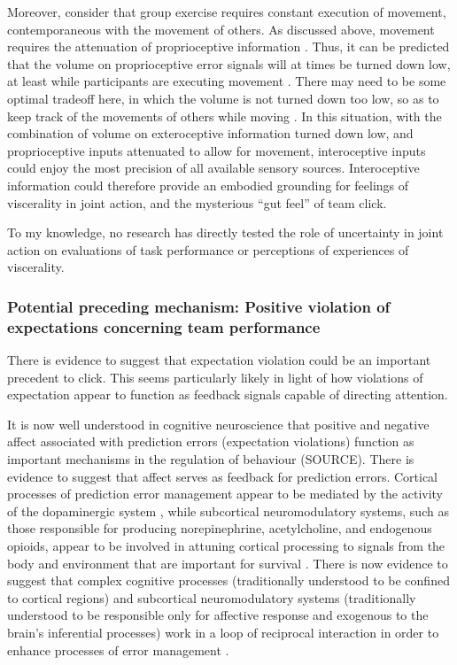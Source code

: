 \begin{CJK}{UTF8}{gbsn}
Moreover, consider that group exercise requires constant execution of movement, contemporaneous with the movement of others. As discussed above, movement requires the attenuation of proprioceptive information \citep[so as not to interrupt the flow of movement itself, see][]{Dietrich2004a}. Thus, it can be predicted that the volume on proprioceptive error signals will at times be turned down low, at least while participants are executing movement \citep{Friston2015}.  There may need to be some optimal tradeoff here, in which the volume is not turned down too low, so as to keep track of the movements of others while moving \citep{Pesquita2017}.  In this situation, with the combination of volume on exteroceptive information turned down low, and proprioceptive inputs attenuated to allow for movement, interoceptive inputs could enjoy the most precision of all available sensory sources.  Interoceptive information could therefore provide an embodied grounding for feelings of viscerality in joint action, and the mysterious ``gut feel'' of team click.

To my knowledge, no research has directly tested the role of uncertainty in joint action on evaluations of task performance or perceptions of experiences of viscerality.



\subsubsection{Potential preceding mechanism: Positive violation of expectations concerning team performance}


There is evidence to suggest that expectation violation could be an important precedent to click. This seems particularly likely in light of how violations of expectation appear to function as feedback signals capable of directing attention.

It is now well understood in cognitive neuroscience that positive and negative affect associated with prediction errors (expectation violations) function as important mechanisms in the regulation of behaviour (SOURCE).  There is evidence to suggest that affect serves as feedback for prediction errors.  Cortical processes of prediction error management appear to be mediated by the activity of the dopaminergic system \citep{Schultz2016,Friston2012}, while subcortical neuromodulatory systems, such as those responsible for producing norepinephrine, acetylcholine, and endogenous opioids, appear to be involved in attuning cortical processing to signals from the body and environment that are important for survival \citep{Lewis2005}.  There is now evidence to suggest that complex cognitive processes (traditionally understood to be confined to cortical regions) and subcortical neuromodulatory systems (traditionally understood to be responsible only for affective response and exogenous to the brain's inferential processes) work in a loop of reciprocal interaction in order to enhance processes of error management \citep{Damasio1994,Lewis2005,Miller2017,Barrett2017}.


\end{CJK}

